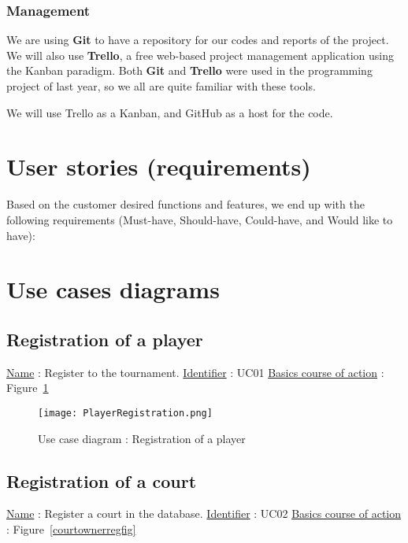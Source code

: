 \subsubsection{Management}

We are using \textbf{Git} to have a repository for our codes and reports of the project. We will also use \textbf{Trello}, a free web-based project management application using the Kanban paradigm. Both \textbf{Git} and \textbf{Trello} were used in the programming project of last year, so we all are quite familiar with these tools.

We will use Trello as a Kanban, and GitHub as a host for the code. \newline
\fi

\section{User stories (requirements)}
Based on the customer desired functions and features, we end up with the
following requirements (Must-have, Should-have, Could-have, and Would like
to have):



\section{Use cases diagrams}
\subsection{Registration of a player}

\noindent \underline{Name} : Register to the tournament. \newline
\underline{Identifier} : UC01 \newline
\underline{Basics course of action} : Figure~\ref{playerregistrationfig} \newline

\begin{figure}[!ht]
    \centering
    \texttt{[image: PlayerRegistration.png]}
    \caption{Use case diagram : Registration of a player}
    \label{playerregistrationfig}
\end{figure}
\FloatBarrier

\subsection{Registration of a court}

\noindent \underline{Name} : Register a court in the database. \newline
\underline{Identifier} : UC02 \newline
\underline{Basics course of action} : Figure~\ref{courtownerregfig} \newline


